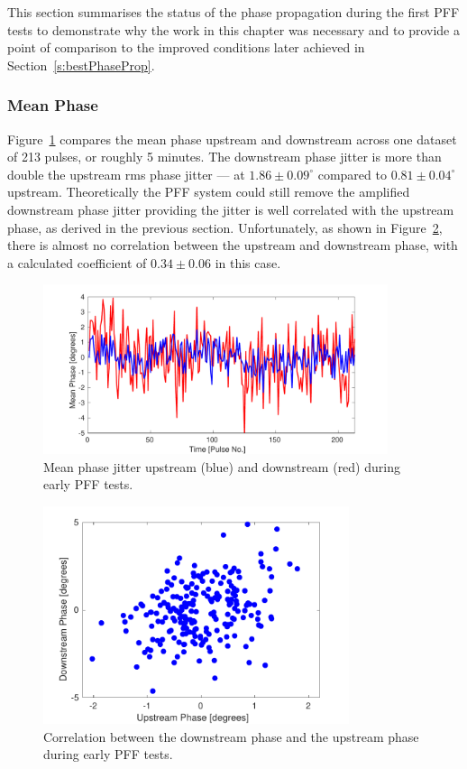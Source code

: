 
This section summarises the status of the phase propagation during the first PFF tests to demonstrate why the work in this chapter was necessary and to provide a point of comparison to the improved conditions later achieved in Section~\ref{s:bestPhaseProp}.

\subsubsection{Mean Phase}

Figure~\ref{f:origMeanPhJit} compares the mean phase upstream and downstream across one dataset of 213 pulses, or roughly 5 minutes. The downstream phase jitter is more than double the upstream rms phase jitter --- at \(1.86\pm0.09^\circ\) compared to \(0.81\pm0.04^\circ\) upstream. Theoretically the PFF system could still remove the amplified downstream phase jitter providing the jitter is well correlated with the upstream phase, as derived in the previous section. Unfortunately, as shown in Figure~\ref{f:origUpVsDown}, there is almost no correlation between the upstream and downstream phase, with a calculated coefficient of \(0.34\pm0.06\) in this case.

\begin{figure}
  \centering
  \includegraphics[width=0.9\textwidth]{Figures/propagation/origMeanPhJit}
  \caption{Mean phase jitter upstream (blue) and downstream (red) during early PFF tests.}
  \label{f:origMeanPhJit}
\end{figure}

\begin{figure}
  \centering
  \includegraphics[width=0.8\textwidth]{Figures/propagation/origUpVsDown}
  \caption{Correlation between the downstream phase and the upstream phase during early PFF tests.}
  \label{f:origUpVsDown}
\end{figure}

